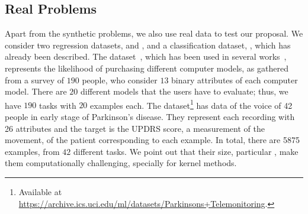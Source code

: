 \subsection{Real Problems}


%

%

Apart from the synthetic problems, we also use real data to test our proposal. We consider two regression datasets,  and , and a classification dataset, , which has already been described.
%
The  dataset~\citep{Lenk96}, which has been used in several works~\citep{ArgyriouEP08,AgarwalDG10,KumarD12,JeongJ18}, represents the likelihood of purchasing different computer models, as gathered from a survey of $190$ people, who consider $13$ binary attributes of each computer model. There are $20$ different models that the users have to evaluate; thus, we have $190$ tasks with $20$ examples each.
%
The  dataset\footnote{Available at \url{https://archive.ics.uci.edu/ml/datasets/Parkinsons+Telemonitoring}.} has data of the voice of 42 people in early stage of Parkinson's disease. They represent each recording with 26 attributes and the target is the UPDRS score, a measurement of the movement, of the patient corresponding to each example. 
In total, there are \num{5875} examples, from $42$ different tasks.
%
%
We point out that their size, particular , make them computationally challenging, specially for kernel methods.




